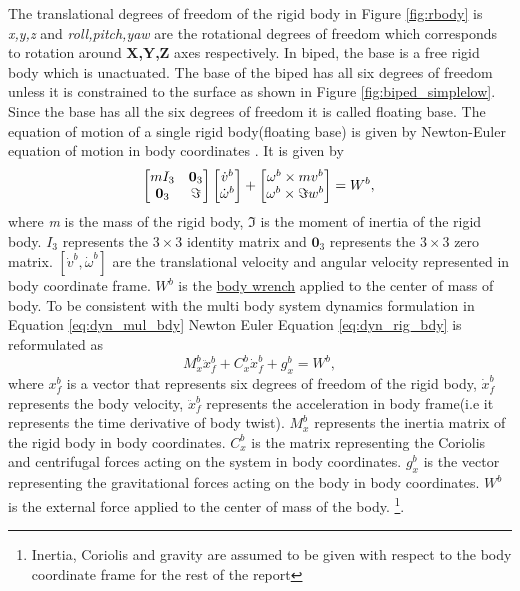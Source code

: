 The translational degrees of freedom of the rigid body in Figure \ref{fig:rbody} is \emph{x,y,z} and \emph{roll,pitch,yaw} are the rotational degrees of freedom which corresponds to rotation around \textbf{X,Y,Z} axes respectively. In biped, the base is a free rigid body which is unactuated. The base of the biped has all six degrees of freedom unless it is constrained to the surface as shown in Figure \ref{fig:biped_simplelow}. Since the base has all the six degrees of freedom it is called floating base. The equation of motion of a single rigid body(floating base) is given by Newton-Euler equation of motion in body coordinates \cite[Chapter 4]{mur94}. It is given by 
\begin{equation}
\label{eq:dyn_rig_bdy}
\begin{bmatrix}
mI_3 & \textbf{0}_3 \\ \textbf{0}_3 &\Im
\end{bmatrix}
\begin{bmatrix}
\dot{v}^b\\ \dot{\omega}^b
\end{bmatrix}
+ \begin{bmatrix}
\omega^b \times mv^b \\ 
\omega^b \times \Im w^b
\end{bmatrix}
= W^b,\\
\end{equation}
where \emph{m} is the mass of the rigid body, $\Im$ is the moment of inertia of the rigid body. $I_3$ represents the $3 \times 3$ identity matrix and $ \textbf{0}_3$ represents the  $3 \times 3$ zero matrix. $[\dot{v}^b,\dot{\omega}^b]$ are the translational velocity and angular velocity represented in body coordinate frame. $W^b$ is the \underline{body wrench}  applied to the center of mass of body. To be consistent with the multi body system dynamics formulation in Equation \ref{eq:dyn_mul_bdy} Newton Euler Equation \ref{eq:dyn_rig_bdy} is reformulated as
\begin{equation}
\label{eq:dyn_rig_bdy_sh}
M_x^b \ddot{x}_f^b + C_x^b\dot{x}_f^b+g_x^b = W^b,
\end{equation}
 where $x_f^b$ is a vector that represents six degrees of freedom of the rigid body, $\dot{x}_f^b$ represents the body velocity, $\ddot{x}_f^b$ represents the acceleration in body frame(i.e it represents the time derivative of body twist). $M_x^b$ represents the inertia matrix of the rigid body in body coordinates. $C_x^b$ is the matrix representing the Coriolis and centrifugal forces acting on the system in body coordinates. $g_x^b$ is the vector representing the gravitational forces acting on the body in body coordinates. $W^b$ is the external force applied to the center of mass of the body. \footnote[2]{Inertia, Coriolis and gravity are assumed to be given with respect to the body coordinate frame for the rest of the report}.


